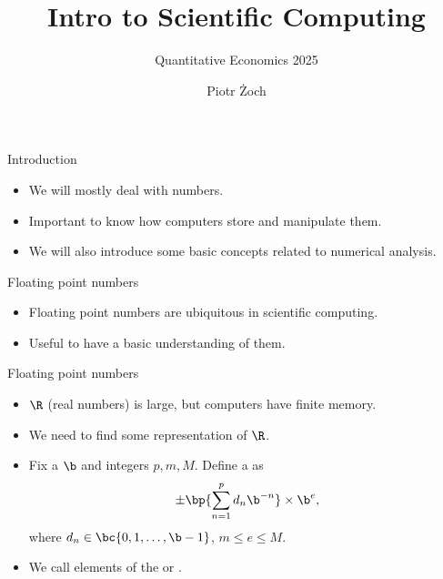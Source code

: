 \documentclass[11pt,xcolor={dvipsnames},aspectratio=159,hyperref={pdftex,pdfpagemode=UseNone,hidelinks,pdfdisplaydoctitle=true},usepdftitle=false]{beamer}
\begin{document}
\title{Intro to Scientific Computing}
\subtitle{Quantitative Economics 2025}

\author{Piotr Żoch}%
\frame{\titlepage}

\begin{frame}{Introduction}   
\begin{itemize}
    \item We will mostly deal with numbers. 
    \item Important to know how computers store and manipulate them.
    \item We will also introduce some basic concepts related to numerical analysis.
\end{itemize}
\end{frame}


\begin{frame}{Floating point numbers}
    \begin{itemize}
        \item Floating point numbers are ubiquitous in scientific computing.
        \item Useful to have a basic understanding of them.
    \end{itemize}
\end{frame}

\begin{frame}{Floating point numbers}
    \begin{itemize}
        \item  $\R$ (real numbers) is large, but computers have finite memory.
        \item We need to find some representation of $\R$.
        \item Fix a  $\b$ and integers $p, m, M$. Define a  as
            \begin{align*}
                 \pm  \bp{\sum_{n=1}^p d_n \b^{-n}} \times  \b^e,
            \end{align*}                
            where $d_n\in \bc{0,1,\ldots,\b-1}$, $m\leq e \leq M$.
            \item We call elements of the   or .
    \end{itemize}
    \end{frame}
\end{document}
